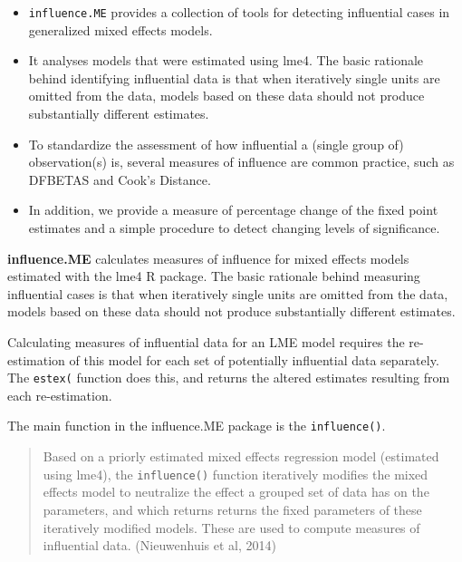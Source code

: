 \documentclass[12pt, a4paper]{article}
\begin{document}
\begin{itemize}
\item \texttt{influence.ME} provides a collection of tools for
detecting influential cases in generalized mixed effects
models. 

\item It analyses models that were estimated using lme4. The
basic rationale behind identifying influential data is that
when iteratively single units are omitted from the data, models
based on these data should not produce substantially different
estimates. 

\item To standardize the assessment of how influential a
(single group of) observation(s) is, several measures of
influence are common practice, such as DFBETAS and Cook's Distance.

\item In addition, we provide a measure of percentage change of the fixed point
estimates and a simple procedure to detect changing levels of significance.
\end{itemize}

\textbf{influence.ME} calculates measures of influence for mixed effects models estimated with the lme4 R package. The
basic rationale behind measuring influential cases is that when iteratively single units are omitted
from the data, models based on these data should not produce substantially different estimates. 

Calculating measures of influential data for an LME model requires the re-estimation
of this model for each set of potentially influential data separately. The \texttt{estex(} function does this,
and returns the altered estimates resulting from each re-estimation. 

The main function in the influence.ME package is the \texttt{influence()}.

\begin{quote} Based on a priorly estimated
mixed effects regression model (estimated using lme4), the \texttt{influence()} function iteratively modifies
the mixed effects model to neutralize the effect a grouped set of data has on the parameters, and
which returns returns the fixed parameters of these iteratively modified models. These are used to
compute measures of influential data. (Nieuwenhuis et al, 2014)
\end{quote}
\end{document}
